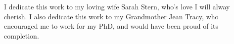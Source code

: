 I dedicate this work to my loving wife Sarah Stern, who's love I will alway cherish.
I also dedicate this work to my Grandmother Jean Tracy, who encouraged me to work for my PhD, and would have been proud of its completion.
